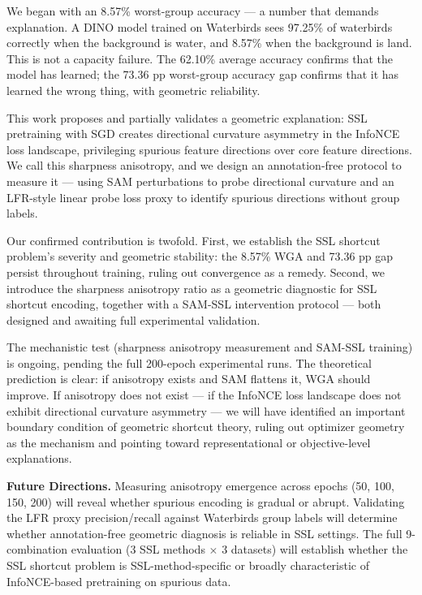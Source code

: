 
We began with an 8.57\% worst-group accuracy --- a number that demands explanation. A DINO model trained on Waterbirds sees 97.25\% of waterbirds correctly when the background is water, and 8.57\% when the background is land. This is not a capacity failure. The 62.10\% average accuracy confirms that the model has learned; the 73.36 pp worst-group accuracy gap confirms that it has learned the wrong thing, with geometric reliability.

This work proposes and partially validates a geometric explanation: SSL pretraining with SGD creates directional curvature asymmetry in the InfoNCE loss landscape, privileging spurious feature directions over core feature directions. We call this sharpness anisotropy, and we design an annotation-free protocol to measure it --- using SAM perturbations to probe directional curvature and an LFR-style linear probe loss proxy to identify spurious directions without group labels.

Our confirmed contribution is twofold. First, we establish the SSL shortcut problem's severity and geometric stability: the 8.57\% WGA and 73.36 pp gap persist throughout training, ruling out convergence as a remedy. Second, we introduce the sharpness anisotropy ratio as a geometric diagnostic for SSL shortcut encoding, together with a SAM-SSL intervention protocol --- both designed and awaiting full experimental validation.

The mechanistic test (sharpness anisotropy measurement and SAM-SSL training) is ongoing, pending the full 200-epoch experimental runs. The theoretical prediction is clear: if anisotropy exists and SAM flattens it, WGA should improve. If anisotropy does not exist --- if the InfoNCE loss landscape does not exhibit directional curvature asymmetry --- we will have identified an important boundary condition of geometric shortcut theory, ruling out optimizer geometry as the mechanism and pointing toward representational or objective-level explanations.

\textbf{Future Directions.} Measuring anisotropy emergence across epochs (50, 100, 150, 200) will reveal whether spurious encoding is gradual or abrupt. Validating the LFR proxy precision/recall against Waterbirds group labels will determine whether annotation-free geometric diagnosis is reliable in SSL settings. The full 9-combination evaluation (3 SSL methods $\times$ 3 datasets) will establish whether the SSL shortcut problem is SSL-method-specific or broadly characteristic of InfoNCE-based pretraining on spurious data.

